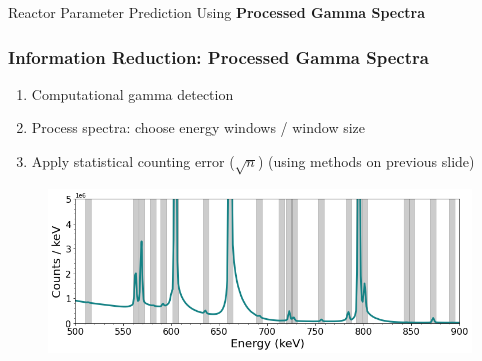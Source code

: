 \begin{frame}
\begin{adjustwidth}{-10pt}{-10pt}
\begin{minipage}{0.5\textwidth}
\begin{block}{Reactor Parameter Prediction Using \textbf{Processed Gamma Spectra}}
\begin{figure}
      \end{figure}
    \end{block}
  \end{minipage}
  \end{adjustwidth}
\end{frame}

\begin{frame}
  \frametitle{Information Reduction: Processed Gamma Spectra}
  \begin{enumerate}
    \item Computational gamma detection \cite{gadras} 
    \item Process spectra: choose energy windows / window size
    \item Apply statistical counting error ($\sqrt{n}$) (using methods on previous slide)
  \end{enumerate}
  \begin{figure}
    \centering
    \includegraphics[width=\textwidth]{./figures/energy_window_example.png}
  \end{figure}
\end{frame}

